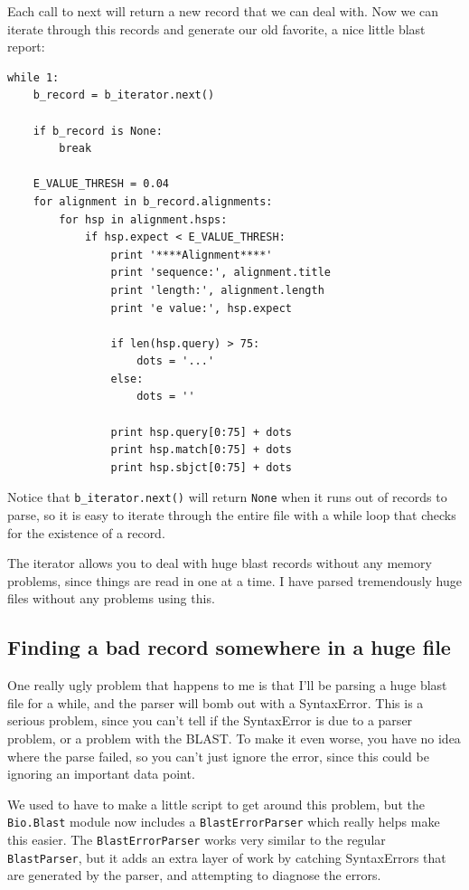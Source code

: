 \documentclass{report}
\begin{document}
Each call to next will return a new record that we can deal with. Now we can iterate through this records and generate our old favorite, a nice little blast report:

\begin{verbatim}
while 1:
    b_record = b_iterator.next()

    if b_record is None:
        break

    E_VALUE_THRESH = 0.04
    for alignment in b_record.alignments:
        for hsp in alignment.hsps:
            if hsp.expect < E_VALUE_THRESH:
                print '****Alignment****'
                print 'sequence:', alignment.title
                print 'length:', alignment.length
                print 'e value:', hsp.expect

                if len(hsp.query) > 75:
                    dots = '...'
                else:
                    dots = ''
                
                print hsp.query[0:75] + dots
                print hsp.match[0:75] + dots
                print hsp.sbjct[0:75] + dots
\end{verbatim}

Notice that \verb|b_iterator.next()| will return \verb|None| when it runs out of records to parse, so it is easy to iterate through the entire file with a while loop that checks for the existence of a record.


The iterator allows you to deal with huge blast records without any memory problems, since things are read in one at a time. I have parsed tremendously huge files without any problems using this.

\subsection{Finding a bad record somewhere in a huge file}

One really ugly problem that happens to me is that I'll be parsing a huge blast file for a while, and the parser will bomb out with a SyntaxError. This is a serious problem, since you can't tell if the SyntaxError is due to a parser problem, or a problem with the BLAST. To make it even worse, you have no idea where the parse failed, so you can't just ignore the error, since this could be ignoring an important data point.


We used to have to make a little script to get around this problem, but the \verb|Bio.Blast| module now includes a \verb|BlastErrorParser| which really helps make this easier. The \verb|BlastErrorParser| works very similar to the regular \verb|BlastParser|, but it adds an extra layer of work by catching SyntaxErrors that are generated by the parser, and attempting to diagnose the errors.
\end{document}
